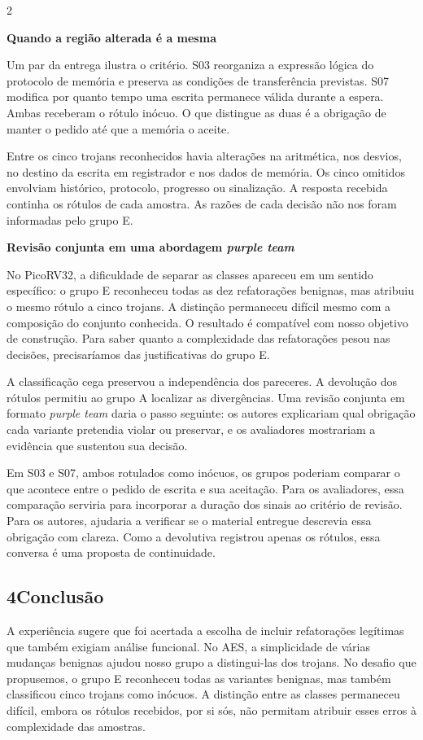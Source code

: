 \documentclass[10pt,a4paper]{article}
\newcommand{\secao}[1]{\subsection*{#1}}
\newcommand{\tema}[1]{\par\medskip\noindent\textbf{#1}\par}
\begin{document}
\begin{multicols}{2}
\tema{Quando a região alterada é a mesma}
Um par da entrega ilustra o critério. S03 reorganiza a expressão lógica do protocolo de memória e preserva as condições de transferência previstas. S07 modifica por quanto tempo uma escrita permanece válida durante a espera. Ambas receberam o rótulo inócuo. O que distingue as duas é a obrigação de manter o pedido até que a memória o aceite.

Entre os cinco trojans reconhecidos havia alterações na aritmética, nos desvios, no destino da escrita em registrador e nos dados de memória. Os cinco omitidos envolviam histórico, protocolo, progresso ou sinalização. A resposta recebida continha os rótulos de cada amostra. As razões de cada decisão não nos foram informadas pelo grupo E.

\tema{Revisão conjunta em uma abordagem \textit{purple team}}
No PicoRV32, a dificuldade de separar as classes apareceu em um sentido específico: o grupo E reconheceu todas as dez refatorações benignas, mas atribuiu o mesmo rótulo a cinco trojans. A distinção permaneceu difícil mesmo com a composição do conjunto conhecida. O resultado é compatível com nosso objetivo de construção. Para saber quanto a complexidade das refatorações pesou nas decisões, precisaríamos das justificativas do grupo E.

A classificação cega preservou a independência dos pareceres. A devolução dos rótulos permitiu ao grupo A localizar as divergências. Uma revisão conjunta em formato \textit{purple team} daria o passo seguinte: os autores explicariam qual obrigação cada variante pretendia violar ou preservar, e os avaliadores mostrariam a evidência que sustentou sua decisão.

Em S03 e S07, ambos rotulados como inócuos, os grupos poderiam comparar o que acontece entre o pedido de escrita e sua aceitação. Para os avaliadores, essa comparação serviria para incorporar a duração dos sinais ao critério de revisão. Para os autores, ajudaria a verificar se o material entregue descrevia essa obrigação com clareza. Como a devolutiva registrou apenas os rótulos, essa conversa é uma proposta de continuidade.

\secao{4\quad Conclusão}
A experiência sugere que foi acertada a escolha de incluir refatorações legítimas que também exigiam análise funcional. No AES, a simplicidade de várias mudanças benignas ajudou nosso grupo a distingui-las dos trojans. No desafio que propusemos, o grupo E reconheceu todas as variantes benignas, mas também classificou cinco trojans como inócuos. A distinção entre as classes permaneceu difícil, embora os rótulos recebidos, por si sós, não permitam atribuir esses erros à complexidade das amostras.


\end{multicols}
\end{document}
